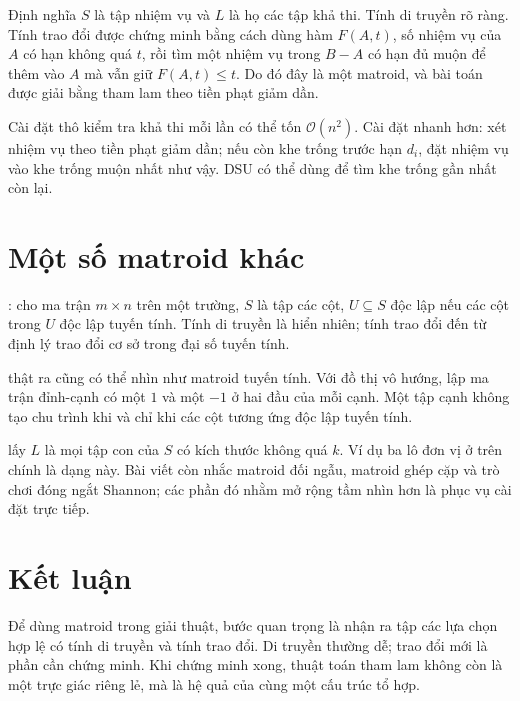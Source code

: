 \documentclass[11pt]{article}
\newcommand{\Oh}{\mathcal{O}}
\begin{document}
Định nghĩa \(S\) là tập nhiệm vụ và \(L\) là họ các tập khả thi. Tính di
truyền rõ ràng. Tính trao đổi được chứng minh bằng cách dùng hàm
\(F(A,t)\), số nhiệm vụ của \(A\) có hạn không quá \(t\), rồi tìm một nhiệm
vụ trong \(B-A\) có hạn đủ muộn để thêm vào \(A\) mà vẫn giữ
\(F(A,t)\le t\). Do đó đây là một matroid, và bài toán được giải bằng tham
lam theo tiền phạt giảm dần.

Cài đặt thô kiểm tra khả thi mỗi lần có thể tốn \(\Oh(n^2)\). Cài đặt nhanh
hơn: xét nhiệm vụ theo tiền phạt giảm dần; nếu còn khe trống trước hạn
\(d_i\), đặt nhiệm vụ vào khe trống muộn nhất như vậy. DSU có thể dùng để tìm
khe trống gần nhất còn lại.

\section{Một số matroid khác}

: cho ma trận \(m\times n\) trên một trường, \(S\)
là tập các cột, \(U\subseteq S\) độc lập nếu các cột trong \(U\) độc lập
tuyến tính. Tính di truyền là hiển nhiên; tính trao đổi đến từ định lý trao
đổi cơ sở trong đại số tuyến tính.

 thật ra cũng có thể nhìn như matroid tuyến tính. Với
đồ thị vô hướng, lập ma trận đỉnh-cạnh có một \(1\) và một \(-1\) ở hai đầu
của mỗi cạnh. Một tập cạnh không tạo chu trình khi và chỉ khi các cột tương
ứng độc lập tuyến tính.

 lấy \(L\) là mọi tập con của \(S\) có kích thước không
quá \(k\). Ví dụ ba lô đơn vị ở trên chính là dạng này. Bài viết còn nhắc
matroid đối ngẫu, matroid ghép cặp và trò chơi đóng ngắt Shannon; các phần
đó nhằm mở rộng tầm nhìn hơn là phục vụ cài đặt trực tiếp.

\section{Kết luận}

Để dùng matroid trong giải thuật, bước quan trọng là nhận ra tập các lựa chọn
hợp lệ có tính di truyền và tính trao đổi. Di truyền thường dễ; trao đổi mới
là phần cần chứng minh. Khi chứng minh xong, thuật toán tham lam không còn là
một trực giác riêng lẻ, mà là hệ quả của cùng một cấu trúc tổ hợp.
\end{document}
